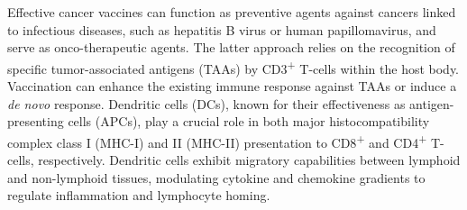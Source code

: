 \documentclass[
]{article}
\begin{document}
Effective cancer vaccines can function as preventive agents against
cancers linked to infectious diseases, such as hepatitis B virus or
human papillomavirus, and serve as onco-therapeutic agents. The latter
approach relies on the recognition of specific tumor-associated antigens
(TAAs) by CD3\textsuperscript{+} T-cells within the host body.
Vaccination can enhance the existing immune response against TAAs or
induce a \emph{de novo} response. Dendritic cells (DCs), known for their
effectiveness as antigen-presenting cells (APCs), play a crucial role in
both major histocompatibility complex class I (MHC-I) and II (MHC-II)
presentation to CD8\textsuperscript{+} and CD4\textsuperscript{+}
T-cells, respectively. Dendritic cells exhibit migratory capabilities
between lymphoid and non-lymphoid tissues, modulating cytokine and
chemokine gradients to regulate inflammation and lymphocyte homing.
\end{document}
